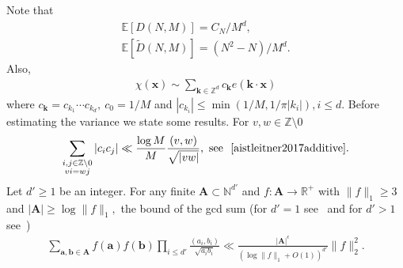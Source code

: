 \documentclass[12pt,article]{amsart}
\theoremstyle{remark}
\numberwithin{equation}{section}
\newcommand{\R}{\mathbb{R}}
\newcommand{\E}{\mathbb{E}}
\newcommand{\Z}{\mathbb{Z}}
\newcommand{\N}{\mathbb{N}}
\newcommand{\boldb}{\boldsymbol{b}}
\newcommand{\boldk}{\boldsymbol{k}}
\newcommand{\boldx}{\boldsymbol{x}}
\newcommand{\bolda}{\boldsymbol{a}}
\newcommand{\boldA}{\boldsymbol{A}}
\begin{document}
	Note that
	\begin{align*}
		\E[D(N,M)]=C_N/M^d,\\
		\E[\widetilde{D}(N,M)]=(N^2-N)/M^d.
	\end{align*}
	Also,
	\begin{align*}
		\chi(\boldx)\sim\sum_{\boldk\in\Z^d}c_{\boldk}e(\boldk\cdot\boldx)
	\end{align*}
	where $c_{\boldk}=c_{k_1}\cdots c_{k_d},\: c_0=1/M$  and 
	$|c_{k_i}|\leq\min(1/M,1/\pi|k_i|),i\leq d.$ Before estimating the variance we state some results. For $v,w\in\Z\setminus 0$
	\begin{align}\label{fourier coeff to gcd sum}
		\sum_{\substack{i,j\in\Z\setminus0\\ vi=wj}}|c_ic_j|\ll\frac{\log M}{M}\frac{(v,w)}{\sqrt{|vw|}}, \text{ see ~\cite[page 474]{aistleitner2017additive}}.
	\end{align}
	Let $d'\geq 1$ be an integer. For any finite $\boldA\subset\N^{d'}$ and $f: \boldA\to\R^+$ with $\|f\|_1\geq 3$ and $|\boldA|\geq\log\|f\|_1,$ the bound of the gcd sum (for $d'=1$ see~\cite[Theorem 2]{Bloom2019GCDSA} and for $d'>1$ see~\cite[Proposition 3.1]{bera das mukhopadhyay2023})
	\begin{align}\label{higher dimensional gcd sum}
		\sum_{\bolda,\boldb\in \boldA}f(\bolda)f(\boldb)\prod_{i\leq d' }\frac{(a_i,b_i)}{\sqrt{a_ib_i}}\ll\frac{|\boldA|^{\epsilon}}{(\log\|f\|_1+O(1))^{d'}}\|f\|_2^2.
	\end{align}
	
\end{document}
